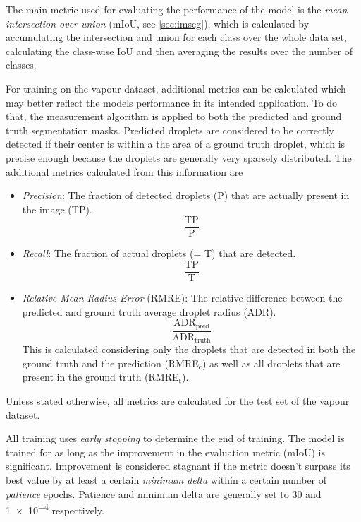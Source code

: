 The main metric used for evaluating the performance of the model is the \emph{mean intersection over union} (mIoU, see \ref{sec:imseg}), which is calculated by accumulating the intersection and union for each class over the whole data set, calculating the class-wise IoU and then averaging the results over the number of classes.  

For training on the vapour dataset, additional metrics can be calculated which may better reflect the models performance in its intended application. To do that, the measurement algorithm is applied to both the predicted and ground truth segmentation masks. Predicted droplets are considered to be correctly detected if their center is within a the area of a ground truth droplet, which is precise enough because the droplets are generally very sparsely distributed.
The additional metrics calculated from this information are 
\begin{itemize}
    \item \emph{Precision}: The fraction of detected droplets (P) that are actually present in the image (TP). $$\frac{\text{TP}}{\text{P}}$$
    \item \emph{Recall}: The fraction of actual droplets (= T) that are detected. $$\frac{\text{TP}}{\text{T}}$$
    \item \emph{Relative Mean Radius Error} (RMRE): The relative difference between the predicted and ground truth average droplet radius (ADR). $$\frac{\text{ADR}_\text{pred}}{\text{ADR}_\text{truth}}$$
    This is calculated considering only the droplets that are detected in both the ground truth and the prediction (RMRE$_\text{c}$) as well as all droplets that are present in the ground truth (RMRE$_\text{t}$).
\end{itemize}
Unless stated otherwise, all metrics are calculated for the test set of the vapour dataset.

All training uses \emph{early stopping} to determine the end of training. The model is trained for as long as the improvement in the evaluation metric (mIoU) is significant. Improvement is considered stagnant if the metric doesn't surpass its best value by at least a certain \emph{minimum delta} within a certain number of \emph{patience} epochs. Patience and minimum delta are generally set to 30 and \num{1e-4} respectively.

